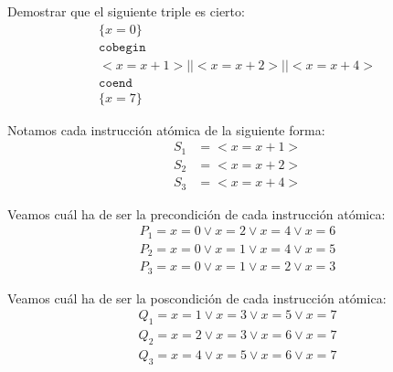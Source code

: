 \begin{ejercicio}
    Demostrar que el siguiente triple es cierto:
    \begin{gather*}
        \{x=0\}\\ 
        \texttt{cobegin} \\
        <x=x+1> || <x=x+2> || <x=x+4> \\
        \texttt{coend} \\
        \{x=7\}
    \end{gather*}

    Notamos cada instrucción atómica de la siguiente forma:
    \begin{align*}
        S_1 &= <x=x+1> \\
        S_2 &= <x=x+2> \\
        S_3 &= <x=x+4>
    \end{align*}

    Veamos cuál ha de ser la precondición de cada instrucción atómica:
    \begin{align*}
        P_1 = x=0 \lor x=2 \lor x=4 \lor x=6 \\
        P_2 = x=0 \lor x=1 \lor x=4 \lor x=5 \\
        P_3 = x=0 \lor x=1 \lor x=2 \lor x=3
    \end{align*}

    Veamos cuál ha de ser la poscondición de cada instrucción atómica:
    \begin{align*}
        Q_1 = x=1 \lor x=3 \lor x=5 \lor x=7 \\
        Q_2 = x=2 \lor x=3 \lor x=6 \lor x=7 \\
        Q_3 = x=4 \lor x=5 \lor x=6 \lor x=7
    \end{align*}


\end{ejercicio}
